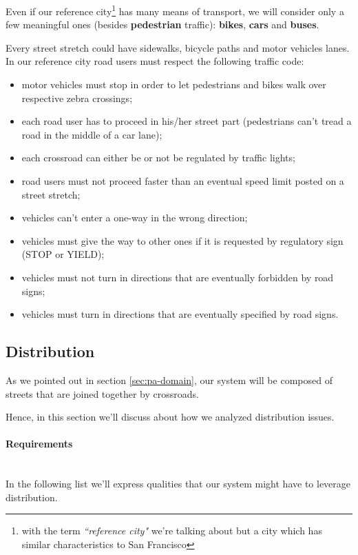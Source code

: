 Even if our reference city\footnote{with the term \emph{``reference city"}
we're talking about but a city which has similar characteristics to San
Francisco} has many means of transport, we will consider only a few meaningful
ones (besides \textbf{pedestrian} traffic): \textbf{bikes}, \textbf{cars} and
\textbf{buses}.

Every street stretch could have sidewalks, bicycle paths and motor vehicles
lanes. In our reference city road users must respect the following traffic
code:

\begin{itemize}
\item motor vehicles must stop in order to let pedestrians and bikes walk over
  respective zebra crossings;
\item each road user has to proceed in his/her street part (pedestrians can't
  tread a road in the middle of a car lane);
\item each crossroad can either be or not be regulated by traffic lights;
\item road users must not proceed faster than an eventual speed limit posted
  on a street stretch;
\item vehicles can't enter a one-way in the wrong direction;
\item vehicles must give the way to other ones if it is requested by
  regulatory sign (STOP or YIELD);
\item vehicles must not turn in directions that are eventually forbidden by
  road signs;
\item vehicles must turn in directions that are eventually specified by road
  signs.
\end{itemize}

\subsection{Distribution}\label{sec:pa-distribution}
As we pointed out in section \ref{sec:pa-domain}, our system will be composed
of streets that are joined together by crossroads.

Hence, in this section we'll discuss about how we analyzed distribution issues.

\paragraph{Requirements} \mbox{} \\

In the following list we’ll express qualities that our system might have to leverage distribution.

